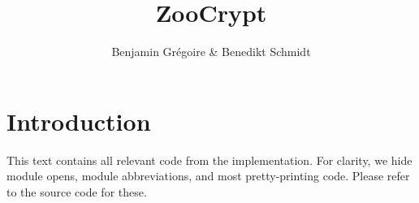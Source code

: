 \documentclass[12pt]{book}
\begin{document}
\renewcommand{\ocwmodule}[1]{\section{Module #1}}
\renewcommand{\ocwyaccmodule}[1]{\section{Module #1 (Yacc)}}
\renewcommand{\ocwlexmodule}[1]{\section{Module #1 (Lex)}}
\renewcommand{\ocwinterface}[1]{\section{Interface #1}}

\newcommand{\ic}[1]{\vspace{-1.75em}\begin{leftbar}\noindent #1\end{leftbar}\vspace{-0.75em}}


\newcommand{\hd}[1]{\vspace{-1.75em}\begin{framed}\noindent\bf #1\end{framed}\vspace{-0.75em}}

\newcommand{\group}{\mathbb{G}}
\newcommand{\field}{\mathbb{F}_p}
\newcommand{\ZZ}{\mathbb{Z}}
\newcommand{\ZooCrypt}{\textsf{ZooCrypt}}


\title{ZooCrypt}
\author{Benjamin Gr\'egoire \& Benedikt Schmidt}

\maketitle
 
\tableofcontents
\newpage

\section*{Introduction}

This text contains all relevant code from the implementation.
For clarity, we hide module opens, module abbreviations, and
most pretty-printing code. Please refer to the source code for
these.
\end{document}
